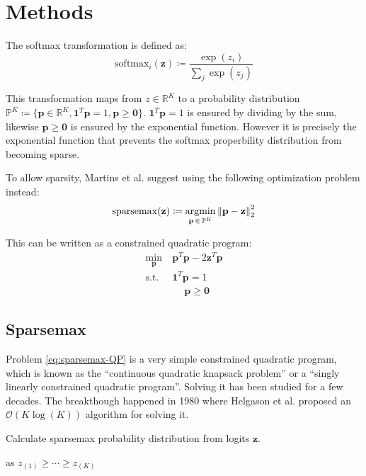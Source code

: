 \section{Methods}

The softmax transformation is defined as:
\begin{equation}
\mathrm{softmax}_i(\mathbf{z}) \coloneqq \frac{\exp(z_i)}{\sum_{j} \exp(z_j)}
\end{equation}

This transformation maps from $z \in \mathbb{R}^K$ to a probability distribution $\mathbb{P}^K \coloneqq \{ \mathbf{p} \in \mathbb{R}^K,  \mathbf{1}^T \mathbf{p} = 1, \mathbf{p} \ge \mathbf{0} \}$. $\mathbf{1}^T \mathbf{p} = 1$ is ensured by dividing by the sum, likewise $\mathbf{p} \ge \mathbf{0}$ is ensured by the exponential function. However it is precisely the exponential function that prevents the softmax properbility distribution from becoming sparse.

To allow sparsity, Martins et al. \cite{sparsemax} suggest  using the following optimization problem instead:
\begin{equation}
\mathrm{sparsemax}(\mathbf{z}) \coloneqq \operatorname*{argmin}_{\mathbf{p}\, \in\, \mathbb{P}^K} \left\lVert \mathbf{p} - \mathbf{z} \right\rVert_2^2 
\end{equation}

This can be written as a constrained quadratic program:
\begin{equation}
\begin{aligned}
\min_{\mathbf{p}}\ &\mathbf{p}^T \mathbf{p} - 2 \mathbf{z}^T \mathbf{p} \\
\text{s.t. } &\mathbf{1}^T \mathbf{p} = 1 \\
&\quad\ \mathbf{p} \ge \mathbf{0}
\end{aligned}
\label{eq:sparsemax-QP}
\end{equation}

\subsection{Sparsemax}
Problem \eqref{eq:sparsemax-QP} is a very simple constrained quadratic program, which is known as the ``continuous quadratic knapsack problem'' or a ``singly linearly constrained quadratic program''. Solving it has been studied for a few decades. The breakthough happened in 1980 where Helgason et al. \cite{Helgason1980} proposed an $\mathcal{O}(K \log(K))$ algorithm for solving it.
\begin{algorithm}[H]
  \caption{Calculate sparsemax probability distribution from logits $\mathbf{z}$.}
  \begin{algorithmic}[1]
      \State {} as $z_{(1)} \ge \cdots \ge z_{(K)}$
      \State {}
    \EndFunction
  \end{algorithmic}
\end{algorithm}

